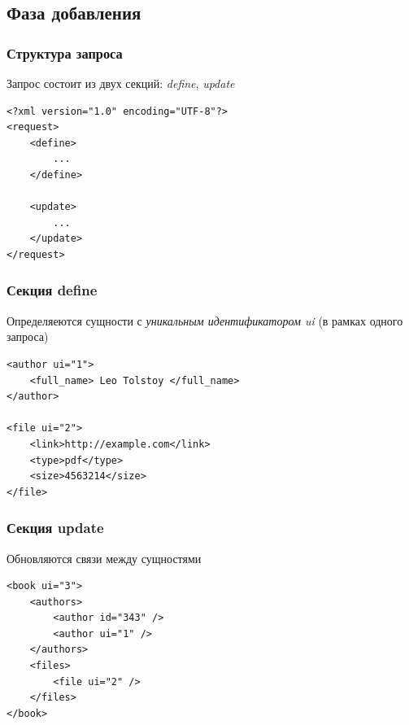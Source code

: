 \documentclass[utf8,handout]{beamer}
\begin{document}
	\subsection{Фаза добавления}
		\begin{frame}[fragile]
 			\frametitle{Структура запроса}
 			Запрос состоит из двух секций: {\em define}, {\em update}
 			\begin{block}{}
	 			\begin{verbatim}
<?xml version="1.0" encoding="UTF-8"?>
<request>
    <define>
        ...
    </define>

    <update>
        ...
    </update>
</request>
				\end{verbatim}
			\end{block}
		\end{frame}
	
		\begin{frame}[fragile]
 			\frametitle{Секция define}
  			Определяеются сущности с {\em уникальным идентификатором ui} (в рамках одного запроса)
 			\begin{block}{}
	 			\begin{verbatim}
<author ui="1">
    <full_name> Leo Tolstoy </full_name>
</author>

<file ui="2">
    <link>http://example.com</link>
    <type>pdf</type>
    <size>4563214</size>
</file>
				\end{verbatim}
			\end{block}
		\end{frame}
	
		\begin{frame}[fragile]
 			\frametitle{Секция update}
 			Обновляются связи между сущностями
 			\begin{block}{}
	 			\begin{verbatim}
<book ui="3">
    <authors>
        <author id="343" />
        <author ui="1" />
    </authors>
    <files>
        <file ui="2" />
    </files>
</book>
				\end{verbatim}
			\end{block} 			
		\end{frame}
	
\end{document}
